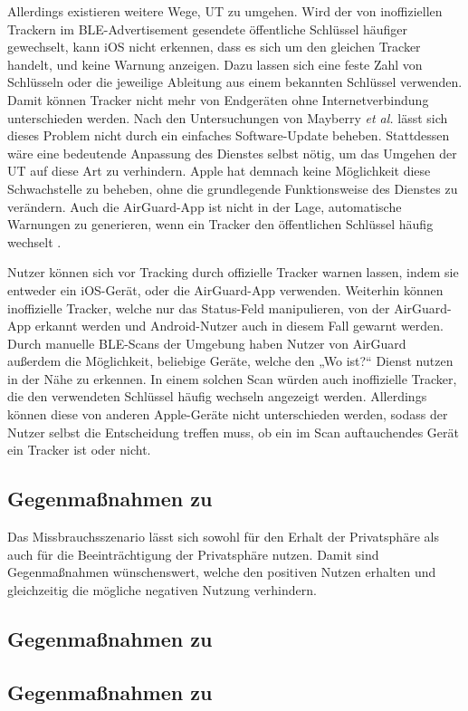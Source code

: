 Allerdings existieren weitere Wege, \ac{UT} zu umgehen.
Wird der von inoffiziellen Trackern im \ac{BLE}-Advertisement gesendete öffentliche Schlüssel häufiger gewechselt, kann iOS nicht erkennen, dass es sich um den gleichen Tracker handelt, und keine Warnung anzeigen.
Dazu lassen sich eine feste Zahl von Schlüsseln oder die jeweilige Ableitung aus einem bekannten Schlüssel verwenden.
Damit können Tracker nicht mehr von Endgeräten ohne Internetverbindung unterschieden werden.
Nach den Untersuchungen von Mayberry \textit{et al.} \cite{Mayberry_Tracking} lässt sich dieses Problem nicht durch ein einfaches Software-Update beheben.
Stattdessen wäre eine bedeutende Anpassung des Dienstes selbst nötig, um das Umgehen der \ac{UT} auf diese Art zu verhindern.
Apple hat demnach keine Möglichkeit diese Schwachstelle zu beheben, ohne die grundlegende Funktionsweise des Dienstes zu verändern.
Auch die AirGuard-App ist nicht in der Lage, automatische Warnungen zu generieren, wenn ein Tracker den öffentlichen Schlüssel häufig wechselt \cite{Heinrich_AirGuard}.

Nutzer können sich vor Tracking durch offizielle Tracker warnen lassen, indem sie entweder ein iOS-Gerät, oder die AirGuard-App verwenden.
Weiterhin können inoffizielle Tracker, welche nur das Status-Feld manipulieren, von der AirGuard-App erkannt werden und Android-Nutzer auch in diesem Fall gewarnt werden.
Durch manuelle \ac{BLE}-Scans der Umgebung haben Nutzer von AirGuard außerdem die Möglichkeit, beliebige Geräte, welche den „Wo ist?“ Dienst nutzen in der Nähe zu erkennen.
In einem solchen Scan würden auch inoffizielle Tracker, die den verwendeten Schlüssel häufig wechseln angezeigt werden.
Allerdings können diese von anderen Apple-Geräte nicht unterschieden werden, sodass der Nutzer selbst die Entscheidung treffen muss, ob ein im Scan auftauchendes Gerät ein Tracker ist oder nicht.

\subsection{Gegenmaßnahmen zu }

Das Missbrauchsszenario  lässt sich sowohl für den Erhalt der Privatsphäre als auch für die Beeinträchtigung der Privatsphäre nutzen.
Damit sind Gegenmaßnahmen wünschenswert, welche den positiven Nutzen erhalten und gleichzeitig die mögliche negativen Nutzung verhindern.


\subsection{Gegenmaßnahmen zu }
\subsection{Gegenmaßnahmen zu }